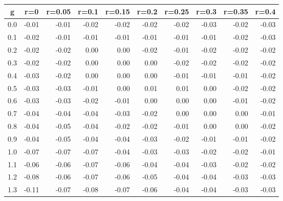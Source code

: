 %
\begin{table}[!tbp]
 \begin{center}
 \begin{tabular}{rrrrrrrrrr}\hline\hline
\multicolumn{1}{c}{g}&\multicolumn{1}{c}{r=0}&\multicolumn{1}{c}{r=0.05}&\multicolumn{1}{c}{r=0.1}&\multicolumn{1}{c}{r=0.15}&\multicolumn{1}{c}{r=0.2}&\multicolumn{1}{c}{r=0.25}&\multicolumn{1}{c}{r=0.3}&\multicolumn{1}{c}{r=0.35}&\multicolumn{1}{c}{r=0.4}\tabularnewline
\hline
0.0&-0.01&-0.01&-0.02&-0.02&-0.02&-0.02&-0.03&-0.02&-0.03\tabularnewline
0.1&-0.02&-0.01&-0.01&-0.01&-0.01&-0.01&-0.01&-0.02&-0.03\tabularnewline
0.2&-0.02&-0.02& 0.00& 0.00&-0.02&-0.01&-0.02&-0.02&-0.02\tabularnewline
0.3&-0.02&-0.02& 0.00& 0.00& 0.00&-0.02&-0.02&-0.02&-0.02\tabularnewline
0.4&-0.03&-0.02& 0.00& 0.00& 0.00&-0.01&-0.01&-0.01&-0.02\tabularnewline
0.5&-0.03&-0.03&-0.01& 0.00& 0.01& 0.01& 0.00&-0.02&-0.02\tabularnewline
0.6&-0.03&-0.03&-0.02&-0.01& 0.00& 0.00& 0.00&-0.01&-0.02\tabularnewline
0.7&-0.04&-0.04&-0.04&-0.03&-0.02& 0.00& 0.00& 0.00&-0.01\tabularnewline
0.8&-0.04&-0.05&-0.04&-0.02&-0.02&-0.01& 0.00& 0.00&-0.02\tabularnewline
0.9&-0.04&-0.05&-0.04&-0.04&-0.03&-0.02&-0.01&-0.01&-0.02\tabularnewline
1.0&-0.07&-0.07&-0.07&-0.04&-0.03&-0.03&-0.02&-0.02&-0.01\tabularnewline
1.1&-0.06&-0.06&-0.07&-0.06&-0.04&-0.04&-0.03&-0.02&-0.02\tabularnewline
1.2&-0.08&-0.06&-0.07&-0.06&-0.05&-0.04&-0.04&-0.03&-0.03\tabularnewline
1.3&-0.11&-0.07&-0.08&-0.07&-0.06&-0.04&-0.04&-0.03&-0.03\tabularnewline
\hline
\end{tabular}

\end{center}

\end{table}

